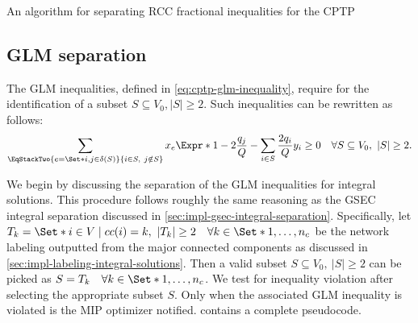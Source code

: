 \begin{algorithm}
	\caption{An algorithm for separating RCC fractional inequalities for the CPTP}
	\label{algo:rcc-frac-sep}
	
\end{algorithm}

\subsection{GLM separation}
\label{sec:impl-glm-separation}

The GLM inequalities, defined in \cref{eq:cptp-glm-inequality},
require for the identification of a subset $S \subseteq V_0, |S| \ge 2$.
Such inequalities can be rewritten as follows:
\begin{equation}
	\sum\limits_{
		\EqStackTwo{e = \Set*{i,j} \in \delta(S)}{i \in S,\ j \notin S}
	} x_e \Expr*{1 - 2 \frac{q_j}{Q}}
	- \sum\limits_{i \in S} \frac{2 q_i}{Q} y_i
	\ge 0 \quad \forall S \subseteq V_0,\ |S| \ge 2
	.
\end{equation}

We begin by discussing the separation of the GLM inequalities for integral solutions.
This procedure follows roughly the same reasoning
as the GSEC integral separation discussed in \cref{sec:impl-gsec-integral-separation}.
Specifically, let $T_k  = \Set*{i \in V \mid cc(i) = k},\ |T_k| \ge 2 \quad \forall k \in \Set*{1, \dots, n_c}$
be the network labeling outputted from the major connected components as discussed in \cref{sec:impl-labeling-integral-solutions}.
Then a valid subset $S \subseteq V_0,\ |S| \ge 2$ can be picked as $S = T_k \quad \forall k \in \Set*{1, \dots, n_c}$.
We test for inequality violation after selecting the appropriate subset $S$.
Only when the associated GLM inequality is violated is the MIP optimizer notified.
 contains a complete pseudocode.

